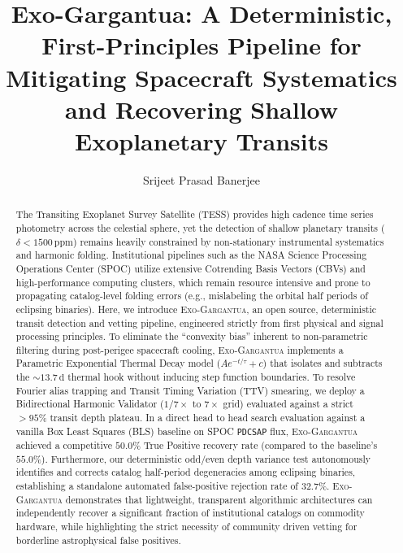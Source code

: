 \documentclass[twocolumn,linenumbers]{aastex701}
\begin{document}
\title{Exo-Gargantua: A Deterministic, First-Principles Pipeline for Mitigating Spacecraft Systematics and Recovering Shallow Exoplanetary Transits}

\author{Srijeet Prasad Banerjee}

\begin{abstract}
The Transiting Exoplanet Survey Satellite (TESS) provides high cadence time series photometry across the celestial sphere, yet the detection of shallow planetary transits ($\delta < 1500\,\text{ppm}$) remains heavily constrained by non-stationary instrumental systematics and harmonic folding. Institutional pipelines such as the NASA Science Processing Operations Center (SPOC) utilize extensive Cotrending Basis Vectors (CBVs) and high-performance computing clusters, which remain resource intensive and prone to propagating catalog-level folding errors (e.g., mislabeling the orbital half periods of eclipsing binaries). Here, we introduce \textsc{Exo-Gargantua}, an open source, deterministic transit detection and vetting pipeline, engineered strictly from first physical and signal processing principles. To eliminate the ``convexity bias'' inherent to non-parametric filtering during post-perigee spacecraft cooling, \textsc{Exo-Gargantua} implements a Parametric Exponential Thermal Decay model ($A e^{-t/\tau} + c$) that isolates and subtracts the $\sim 13.7\,\text{d}$ thermal hook without inducing step function boundaries. To resolve Fourier alias trapping and Transit Timing Variation (TTV) smearing, we deploy a Bidirectional Harmonic Validator ($1/7\times$ to $7\times$ grid) evaluated against a strict $>95\%$ transit depth plateau. In a direct head to head search evaluation against a vanilla Box Least Squares (BLS) baseline on SPOC \texttt{PDCSAP} flux, \textsc{Exo-Gargantua} achieved a competitive $50.0\%$ True Positive recovery rate (compared to the baseline's $55.0\%$). Furthermore, our deterministic odd/even depth variance test autonomously identifies and corrects catalog half-period degeneracies among eclipsing binaries, establishing a standalone automated false-positive rejection rate of $32.7\%$. \textsc{Exo-Gargantua} demonstrates that lightweight, transparent algorithmic architectures can independently recover a significant fraction of institutional catalogs on commodity hardware, while highlighting the strict necessity of community driven vetting for borderline astrophysical false positives.
\end{abstract}
\end{document}

